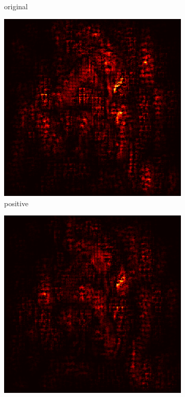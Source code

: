 \documentclass[preprint,12pt]{elsarticle}
\begin{document}
\begin{figure}
\begin{subfigure}{0.14\linewidth}
        \caption{original}
    \end{subfigure}
    \hfill
    \begin{subfigure}{0.14\textwidth}
        \centering
        \includegraphics[width=\linewidth]{../visualizations/examples/imagenette/cnn/positive_saliency_map/3.png}
        \caption{positive}
    \end{subfigure}
    \hfill
    \begin{subfigure}{0.14\textwidth}
        \centering
        \includegraphics[width=\linewidth]{../visualizations/examples/imagenette/cnn/negative_saliency_map/3.png}

\end{subfigure}
\end{figure}
\end{document}

